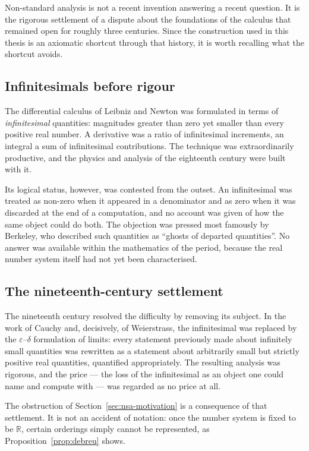 Non-standard analysis is not a recent invention answering a recent question. It is
the rigorous settlement of a dispute about the foundations of the calculus that
remained open for roughly three centuries. Since the construction used in this
thesis is an axiomatic shortcut through that history, it is worth recalling what the
shortcut avoids.

\subsection{Infinitesimals before rigour}

The differential calculus of Leibniz and Newton was formulated in terms of
\emph{infinitesimal} quantities: magnitudes greater than zero yet smaller than every
positive real number. A derivative was a ratio of infinitesimal increments, an
integral a sum of infinitesimal contributions. The technique was extraordinarily
productive, and the physics and analysis of the eighteenth century were built with
it.

Its logical status, however, was contested from the outset. An infinitesimal was
treated as non-zero when it appeared in a denominator and as zero when it was
discarded at the end of a computation, and no account was given of how the same
object could do both. The objection was pressed most famously by Berkeley, who
described such quantities as ``ghosts of departed quantities''. No answer was
available within the mathematics of the period, because the real number system
itself had not yet been characterised.

\subsection{The nineteenth-century settlement}

The nineteenth century resolved the difficulty by removing its subject. In the work
of Cauchy and, decisively, of Weierstrass, the infinitesimal was replaced by the
$\varepsilon$--$\delta$ formulation of limits: every statement previously made about
infinitely small quantities was rewritten as a statement about arbitrarily small but
strictly positive real quantities, quantified appropriately. The resulting analysis
was rigorous, and the price --- the loss of the infinitesimal as an object one could
name and compute with --- was regarded as no price at all.

The obstruction of Section~\ref{sec:nsa-motivation} is a consequence of that
settlement. It is not an accident of notation: once the number system is fixed to be
$\mathbb{R}$, certain orderings simply cannot be represented, as
Proposition~\ref{prop:debreu} shows.

